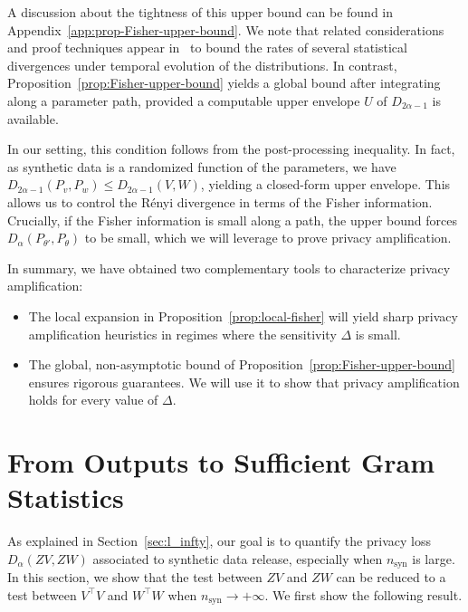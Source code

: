 \documentclass{article}
\theoremstyle{plain}
\theoremstyle{definition}
\theoremstyle{remark}
\begin{document}
A discussion about the tightness of this upper bound can be found in Appendix~\ref{app:prop-Fisher-upper-bound}. We note that related considerations and proof techniques appear in~\citet{Karbowski2024} to bound the rates of several statistical divergences under temporal evolution of the distributions. In contrast, Proposition~\ref{prop:Fisher-upper-bound} yields a global bound after integrating along a parameter path, provided a computable upper envelope $U$ of $D_{2\alpha-1}$ is available. %

In our setting, this condition follows from the post-processing inequality. In fact, as synthetic data is a randomized function of the parameters, we have $D_{2\alpha-1}(P_v,P_w)\leq   D_{2\alpha-1}(V,W)$, yielding a closed-form upper envelope. This allows us to control the Rényi divergence in terms of the Fisher information. Crucially, if the Fisher information is small along a path, the upper bound forces $D_\alpha(P_{\theta'},P_\theta)$ to be small, which we will leverage to prove privacy amplification.

In summary, we have obtained two complementary tools to characterize privacy amplification:
\begin{itemize}
    \item The local expansion in Proposition~\ref{prop:local-fisher} will yield sharp privacy amplification heuristics in regimes where the sensitivity $\Delta$ is small.
    \item The global, non-asymptotic bound of Proposition~\ref{prop:Fisher-upper-bound} ensures rigorous guarantees. We will use it to show that privacy amplification holds for every value of $\Delta$.
\end{itemize}

\section{From Outputs to Sufficient Gram Statistics}
\label{sec:sufficient}

As explained in Section~\ref{sec:l_infty}, our goal is to quantify the privacy loss $D_\alpha(ZV,ZW)$ associated to synthetic data release, especially when $n_{\mathrm{syn}}$ is large. In this section, we show that the test between $ZV$ and $ZW$ can be reduced to a test between $V^\top V$ and $W^\top W$ when $n_{\mathrm{syn}} \to +\infty$.
We first show the following result.
\end{document}
